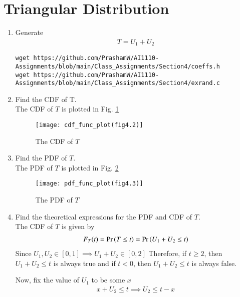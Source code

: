 \documentclass[journal,12pt,twocolumn]{IEEEtran}
\renewcommand\thesection{\arabic{section}}
\begin{document}
\section{Triangular Distribution}
\begin{enumerate}[label=\thesection.\arabic*
,ref=\thesection.\theenumi]
%
\item Generate 
	\begin{align}
		T = U_1+U_2
	\end{align}
\solution
\begin{lstlisting}
wget https://github.com/PrashamW/AI1110-Assignments/blob/main/Class_Assignments/Section4/coeffs.h
wget https://github.com/PrashamW/AI1110-Assignments/blob/main/Class_Assignments/Section4/exrand.c
\end{lstlisting}
\item Find the CDF of T.\\
\solution
The CDF of $T$ is plotted in Fig. \ref{fig:cdf_func_plot(fig4.2)}\\
\begin{figure}
\centering
\texttt{[image: cdf\_func\_plot(fig4.2)]}
\caption{The CDF of $T$}
\label{fig:cdf_func_plot(fig4.2)}
\end{figure}
\item Find the PDF of $T$.\\
\solution
The PDF of $T$ is plotted in Fig. \ref{fig:pdf_func_plot(fig4.3)}\\
\begin{figure}
\centering
\texttt{[image: pdf\_func\_plot(fig4.3)]}
\caption{The PDF of $T$}
\label{fig:pdf_func_plot(fig4.3)}
\end{figure}

\item Find the theoretical expressions for the PDF and CDF of $T$.\\
\solution
The CDF of $T$ is given by
	\begin{align}
		F_T(t) = \Pr\left(T \le t\right) = \Pr\left(U_1 + U_2 \le t\right)	
	\end{align}		
	Since $U_1, U_2 \in [0,1] \implies U_1 + U_2 \in [0,2]$
	Therefore, if $t \ge 2$, then $U_1 + U_2 \le t$ is always true and if $t < 0$, then $U_1 + U_2 \le t$ is always false.
	
	Now, fix the value of $U_1$ to be some $x$
	\begin{align}
		x + U_2 \le t \implies U_2 \le t - x
	\end{align}
	

\end{enumerate}
\end{document}
